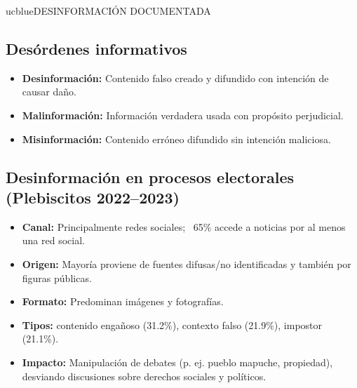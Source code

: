 
\begin{sectionbox}{ucblue}{DESINFORMACIÓN DOCUMENTADA}

\subsection*{\textbf{\textcolor{darktext}{Desórdenes informativos}}}
{\fontsize{18}{22}\selectfont
\begin{itemize}
    \setlength{\itemsep}{0.1cm}
    \item \textbf{Desinformación:} Contenido falso creado y difundido con intención de causar daño.
    \item \textbf{Malinformación:} Información verdadera usada con propósito perjudicial.
    \item \textbf{Misinformación:} Contenido erróneo difundido sin intención maliciosa.
\end{itemize}
}

\vspace{0.12cm}

\subsection*{\textbf{\textcolor{darktext}{Desinformación en procesos electorales (Plebiscitos 2022–2023)}}}
{\fontsize{18}{22}\selectfont
\begin{itemize}
    \setlength{\itemsep}{0.1cm}
    \item \textbf{Canal:} Principalmente redes sociales; ~65\% accede a noticias por al menos una red social.
    \item \textbf{Origen:} Mayoría proviene de fuentes difusas/no identificadas y también por figuras públicas.
    \item \textbf{Formato:} Predominan imágenes y fotografías.
    \item \textbf{Tipos:} contenido engañoso (31.2\%), contexto falso (21.9\%), impostor (21.1\%).
    \item \textbf{Impacto:} Manipulación de debates (p. ej. pueblo mapuche, propiedad), desviando discusiones sobre derechos sociales y políticos.
\end{itemize}
}


\end{sectionbox}